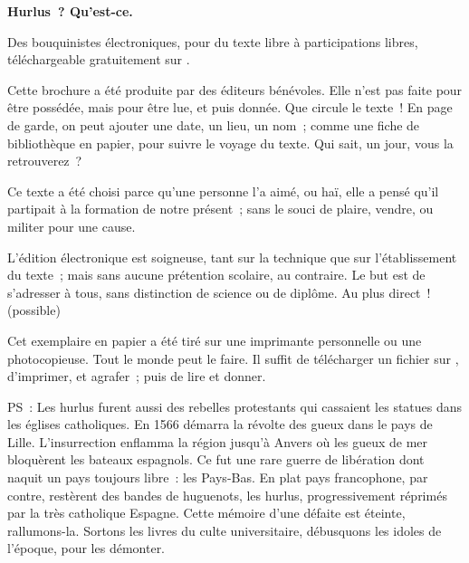 \documentclass[french,twoside]{book} %
\begin{document}
  \hbox{}\newpage
  \ifodd\value{page}\hbox{}\newpage\fi
  {\centering\color{rubric}\bfseries\noindent\large
    Hurlus ? Qu’est-ce.\par
    \bigskip
  }
  \noindent Des bouquinistes électroniques, pour du texte libre à participations libres,
  téléchargeable gratuitement sur \href{https://hurlus.fr}{}.\par
  \bigskip
  \noindent Cette brochure a été produite par des éditeurs bénévoles.
  Elle n’est pas faite pour être possédée, mais pour être lue, et puis donnée.
  Que circule le texte !
  En page de garde, on peut ajouter une date, un lieu, un nom ;
  comme une fiche de bibliothèque en papier,
  pour suivre le voyage du texte. Qui sait, un jour, vous la retrouverez ?
  \par

  Ce texte a été choisi parce qu’une personne l’a aimé,
  ou haï, elle a pensé qu’il partipait à la formation de notre présent ;
  sans le souci de plaire, vendre, ou militer pour une cause.
  \par

  L’édition électronique est soigneuse, tant sur la technique
  que sur l’établissement du texte ; mais sans aucune prétention scolaire, au contraire.
  Le but est de s’adresser à tous, sans distinction de science ou de diplôme.
  Au plus direct ! (possible)
  \par

  Cet exemplaire en papier a été tiré sur une imprimante personnelle
   ou une photocopieuse. Tout le monde peut le faire.
  Il suffit de
  télécharger un fichier sur \href{https://hurlus.fr}{},
  d’imprimer, et agrafer ; puis de lire et donner.\par

  \bigskip

  \noindent PS : Les hurlus furent aussi des rebelles protestants qui cassaient les statues dans les églises catholiques. En 1566 démarra la révolte des gueux dans le pays de Lille. L’insurrection enflamma la région jusqu’à Anvers où les gueux de mer bloquèrent les bateaux espagnols.
  Ce fut une rare guerre de libération dont naquit un pays toujours libre : les Pays-Bas.
  En plat pays francophone, par contre, restèrent des bandes de huguenots, les hurlus, progressivement réprimés par la très catholique Espagne.
  Cette mémoire d’une défaite est éteinte, rallumons-la. Sortons les livres du culte universitaire, débusquons les idoles de l’époque, pour les démonter.
\fi
\end{document}

